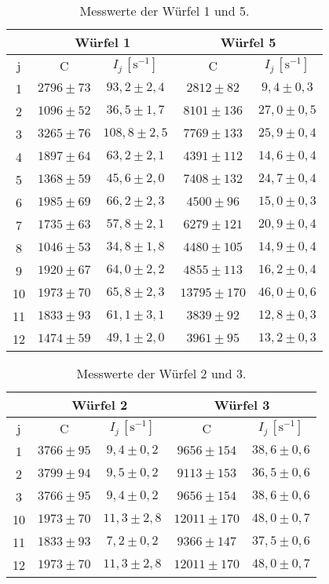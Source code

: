 \begin{table}[H]
    \centering
    \begin{tabular}{|c|c|c|c|c|}  
    \cline{2-5}
    \multicolumn{1}{c|}{} &\multicolumn{2}{c|}{Würfel 1} & \multicolumn{2}{c|}{Würfel 5}\tabularnewline
    \hline
    j & C & $I_{j}\,\left[\text{s}^{-1}\right]$ & C & $I_{j}\,\left[\text{s}^{-1}\right]$\tabularnewline
    \hline
    1 & $2796\pm73$ & $93,2\pm2,4$ & $2812\pm82$& $9,4\pm0,3$\tabularnewline
    \hline
    2 & $1096\pm52$& $36,5\pm1,7$ & $8101\pm136$ & $27,0\pm0,5$\tabularnewline
    \hline
    3 & $3265\pm76$ & $108,8\pm2,5$ & $7769\pm133$ & $25,9\pm0,4$\tabularnewline
    \hline
    4 & $1897\pm64$ & $63,2\pm2,1$ & $4391\pm112$ & $14,6\pm0,4$\tabularnewline
    \hline
    5 & $1368\pm59$ & $45,6\pm2,0$ & $7408\pm132$ & $24,7\pm0,4$\tabularnewline
    \hline
    6 & $1985\pm69$ & $66,2\pm2,3$ & $4500\pm96$ & $15,0\pm0,3$\tabularnewline
    \hline
    7 & $1735\pm63$ & $57,8\pm2,1$ & $6279\pm121$ & $20,9\pm0,4$\tabularnewline
    \hline
    8 & $1046\pm53$ & $34,8\pm1,8$ & $4480\pm105$ & $14,9\pm0,4$\tabularnewline
    \hline
    9 & $1920\pm67$ & $64,0\pm2,2$ & $4855\pm113$ & $16,2\pm0,4$\tabularnewline
    \hline
    10 & $1973\pm70$ & $65,8\pm2,3$ & $13795\pm170$ & $46,0\pm0,6$\tabularnewline
    \hline
    11 & $1833\pm93$ & $61,1\pm3,1$ & $3839\pm92$ & $12,8\pm0,3$\tabularnewline
    \hline
    12 & $1474\pm59$ & $49,1\pm2,0$ & $3961\pm95$ & $13,2\pm0,3$\tabularnewline
    \hline
    \end{tabular}
    \caption{Messwerte der Würfel 1 und 5.}
    \label{tab:W15}
    \end{table}


\begin{table}[H]
        \centering
        \begin{tabular}{|c|c|c|c|c|}
        \cline{2-5}
        \multicolumn{1}{c|}{} &\multicolumn{2}{c|}{Würfel 2} & \multicolumn{2}{c|}{Würfel 3}\tabularnewline
        \hline
        j & C & $I_{j}\,\left[\text{s}^{-1}\right]$ & C & $I_{j}\,\left[\text{s}^{-1}\right]$\tabularnewline
        \hline
        1 & $3766\pm95$ & $9,4\pm0,2$  & $9656\pm154$ & $38,6\pm0,6$\tabularnewline
        \hline
        2 & $3799\pm94$& $9,5\pm0,2$  & $9113\pm153$ & $36,5\pm0,6$\tabularnewline
        \hline
        3 & $3766\pm95$ & $9,4\pm0,2$  & $9656\pm154$ & $38,6\pm0,6$\tabularnewline
        \hline       
        10 & $1973\pm70$ & $11,3\pm2,8$   & $12011\pm170$ & $48,0\pm0,7$\tabularnewline
        \hline
        11 & $1833\pm93$ & $7,2\pm0,2$  & $9366\pm147$ & $37,5\pm0,6$\tabularnewline
        \hline
        12 & $1973\pm70$ & $11,3\pm2,8$  & $12011\pm170$ & $48,0\pm0,7$\tabularnewline
        \hline
        \end{tabular}
        
        \caption{Messwerte der Würfel 2 und 3.}
        \label{tab:W23} 
        \end{table}

